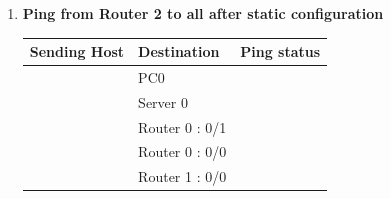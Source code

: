 \documentclass[a4paper,11pt]{article}
\begin{document}
\begin{enumerate}
\begin{enumerate}
              \item \textbf{Ping from Router 2 to all after static configuration}
                    \begin{table}[H]
                        \centering
                        \begin{tabular}{| m{9em}| m{12em}| m{9em} |}
                            \hline
                            \textbf{Sending Host}                                                & \textbf{Destination} & \textbf{Ping status}                                                     \\
                            \hline
                            {\cellcolor[rgb]{0.333,0.686,1}}                                     & PC0                  & {\cellcolor[rgb]{0.365,1,0.741}}                                         \\
                            \hhline{|>{\arrayrulecolor[rgb]{0.333,0.686,1}}->{\arrayrulecolor{black}}->{\arrayrulecolor[rgb]{0.365,1,0.741}}->{\arrayrulecolor{black}}|}
                            {\cellcolor[rgb]{0.333,0.686,1}}                                     & Server 0             & {\cellcolor[rgb]{0.365,1,0.741}}                                         \\
                            \hhline{|>{\arrayrulecolor[rgb]{0.333,0.686,1}}->{\arrayrulecolor{black}}->{\arrayrulecolor[rgb]{0.365,1,0.741}}->{\arrayrulecolor{black}}|}
                            {\cellcolor[rgb]{0.333,0.686,1}}                                     & Router 0 : 0/1       & {\cellcolor[rgb]{0.365,1,0.741}}                                         \\
                            \hhline{|>{\arrayrulecolor[rgb]{0.333,0.686,1}}->{\arrayrulecolor{black}}->{\arrayrulecolor[rgb]{0.365,1,0.741}}->{\arrayrulecolor{black}}|}
                            {\cellcolor[rgb]{0.333,0.686,1}}                                     & Router 0 : 0/0       & {\cellcolor[rgb]{0.365,1,0.741}}                                         \\
                            \hhline{|>{\arrayrulecolor[rgb]{0.333,0.686,1}}->{\arrayrulecolor{black}}->{\arrayrulecolor[rgb]{0.365,1,0.741}}->{\arrayrulecolor{black}}|}
                            {\cellcolor[rgb]{0.333,0.686,1}}                                     & Router 1 : 0/0       & {\cellcolor[rgb]{0.365,1,0.741}}                                         \\

\end{tabular}
\end{table}
\end{enumerate}
\end{enumerate}
\end{document}
